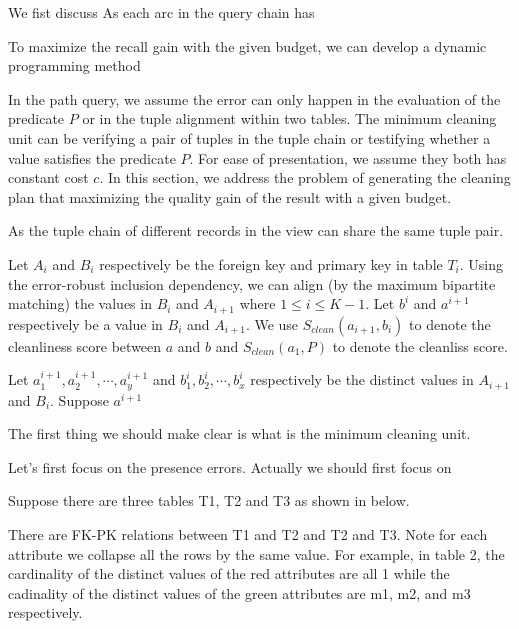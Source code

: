 








\iffalse
We fist discuss As each arc in the query chain has 

To maximize the recall gain with the given budget, we can develop a dynamic programming method


In the path query, we assume the error can only happen in the evaluation of the predicate $P$ or in the tuple alignment within two tables. The minimum cleaning unit can be verifying a pair of tuples in the tuple chain or testifying whether a value satisfies the predicate $P$. For ease of presentation, we assume they both has constant cost $c$. In this section, we address the problem of generating the cleaning plan that maximizing the quality gain of the result with a given budget.


As the tuple chain of different records in the view can share the same tuple pair. 




Let $A_i$ and $B_i$ respectively be the foreign key and primary key in table $T_i$. Using the error-robust inclusion dependency, we can align (by the maximum bipartite matching) the values in $B_i$ and $A_{i+1}$ where $1\leq i\leq K-1$. Let $b^i$ and $a^{i+1}$ respectively be a value in $B_i$ and $A_{i+1}$. We use $S_{clean}(a_{i+1},b_i)$ to denote the cleanliness score between $a$ and $b$ and $S_{clean}(a_1,P)$ to denote the cleanliss score.


Let $a^{i+1}_1, a^{i+1}_2, \cdots, a^{i+1}_y$ and $b^{i}_1, b^{i}_2, \cdots, b^{i}_x$ respectively be the distinct values in  $A_{i+1}$ and $B_i$. Suppose $a^{i+1}$


The first thing we should make clear is what is the minimum cleaning unit. 

Let’s first focus on the presence errors. Actually we should first focus on 

Suppose there are three tables T1, T2 and T3 as shown in below.


There are FK-PK relations between T1 and T2 and T2 and T3. Note for each attribute we collapse all the rows by the same value. For example, in table 2, the cardinality of the distinct values of the red attributes are all 1 while the cadinality of the distinct values of the green attributes are m1, m2, and m3 respectively.


